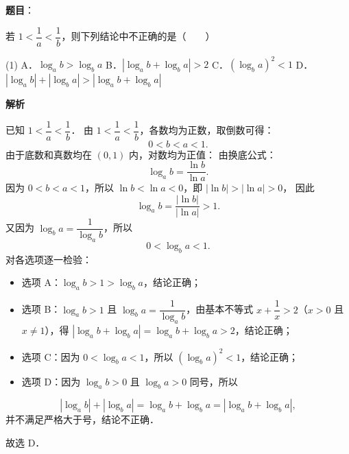 \begin{answer}

\textbf{题目}：

若 $1 < \dfrac{1}{a} < \dfrac{1}{b}$，则下列结论中不正确的是\mbox{（　　）}

\begin{gkopts}(1)
\task A．$\log_a b > \log_b a$
\task B．$|\log_a b + \log_b a| > 2$
\task C．$(\log_b a)^2 < 1$
\task D．$|\log_a b| + |\log_b a| > |\log_a b + \log_b a|$
\end{gkopts}

\textbf{解析}

已知 $1 < \dfrac{1}{a} < \dfrac{1}{b}$．
由 $1 < \dfrac{1}{a} < \dfrac{1}{b}$，各数均为正数，取倒数可得：
\nopagebreak[4]
\[
0 < b < a < 1.
\]
由于底数和真数均在 $(0, 1)$ 内，对数均为正值：
由换底公式：
\nopagebreak[4]
\[
\log_a b = \frac{\ln b}{\ln a}.
\]
因为 $0 < b < a < 1$，所以 $\ln b < \ln a < 0$，即 $|\ln b| > |\ln a| > 0$，
因此
\nopagebreak[4]
\[
\log_a b = \frac{|\ln b|}{|\ln a|} > 1.
\]
又因为 $\log_b a = \dfrac{1}{\log_a b}$，所以
\nopagebreak[4]
\[
0 < \log_b a < 1.
\]
对各选项逐一检验：
\begin{itemize}
\item 选项 A：$\log_a b > 1 > \log_b a$，结论正确；
\item 选项 B：$\log_a b > 1$ 且 $\log_b a = \dfrac{1}{\log_a b}$，由基本不等式 $x + \dfrac{1}{x} > 2$（$x > 0$ 且 $x \neq 1$），得 $|\log_a b + \log_b a| = \log_a b + \log_b a > 2$，结论正确；
\item 选项 C：因为 $0 < \log_b a < 1$，所以 $(\log_b a)^2 < 1$，结论正确；
\item 选项 D：因为 $\log_a b > 0$ 且 $\log_b a > 0$ 同号，所以
\end{itemize}
\nopagebreak[4]
\[
|\log_a b| + |\log_b a| = \log_a b + \log_b a = |\log_a b + \log_b a|,
\]
  并不满足严格大于号，结论不正确．

故选 D．


\end{answer}
